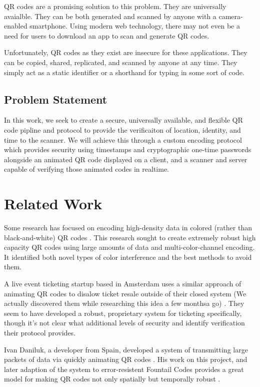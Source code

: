 \documentclass[10pt,twocolumn,letterpaper]{article}
\begin{document}
QR codes are a promising solution to this problem. They are universally avaialble. They can be both generated and scanned by anyone with a camera-enabled smartphone. Using modern web technology, there may not even be a need for users to download an app to scan and generate QR codes.

Unfortunately, QR codes as they exist are insecure for these applications. They can be copied, shared, replicated, and scanned by anyone at any time. They simply act as a static identifier or a shorthand for typing in some sort of code.

\subsection{Problem Statement}
In this work, we seek to create a secure, universally available, and flexible QR code pipline and protocol to provide the verificaiton of location, identity, and time to the scanner. We will achieve this through a custom encoding protocol which provides security using timestamps and cryptographic one-time passwords alongside an animated QR code displayed on a client, and a scanner and server capable of verifying those animated codes in realtime.

\section{Related Work}

Some research has focused on encoding high-density data in colored (rather than black-and-white) QR codes \cite{yang_robust_2018}. This research sought to create extremely robust high capacity QR codes using large amounts of data and multi-color-channel encoding. It identified both novel types of color interference and the best methods to avoid them.

A live event ticketing startup based in Amsterdam uses a similar approach of animating QR codes to disalow ticket resale outside of their closed system (We actually discovered them while researching this idea a few monthsa go) \cite{noauthor_guts_nodate}. They seem to have developed a robust, proprietary system for ticketing specifically, though it's not clear what additional levels of security and identify verification their protocol provides.

Ivan Daniluk, a developer from Spain, developed a system of transmitting large packets of data via quickly animating QR codes \cite{daniluk_animated_2018}. His work on this project, and later adaption of the system to error-resistent Fountail Codes provides a great model for making QR codes not only spatially but temporally robust \cite{daniluk_fountain_2018}.
\end{document}
